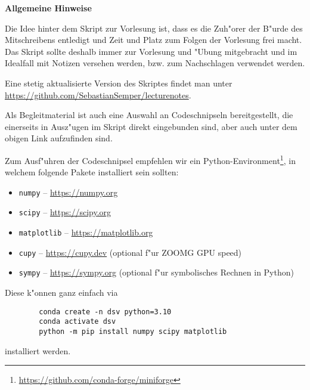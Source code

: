 \glsunsetall
%
\maketitle
\tableofcontents
\clearpage
%
\listoffigures
{}
\listoflistings
{}
\clearpage
%
\pretocmd{\section}{\FloatBarrier\clearpage}{}{}
\pretocmd{\subsection}{\FloatBarrier}{}{}
%
%
\begin{center}
    \begin{minipage}{0.75\textwidth}
        \begin{center}
            \textbf{\large Allgemeine Hinweise}
        \end{center}
        Die Idee hinter dem Skript zur Vorlesung ist, dass es die Zuh"orer der B"urde des Mitschreibens entledigt und Zeit und Platz zum Folgen der Vorlesung frei macht.
        Das Skript sollte deshalb immer zur Vorlesung und "Ubung mitgebracht und im Idealfall mit Notizen versehen werden, bzw. zum Nachschlagen verwendet werden.

        Eine stetig aktualisierte Version des Skriptes findet man unter \url{https://github.com/SebastianSemper/lecturenotes}.

        Als Begleitmaterial ist auch eine Auswahl an Codeschnipseln bereitgestellt, die einerseits in Ausz"ugen im Skript direkt eingebunden sind, aber auch unter dem obigen Link aufzufinden sind.

        Zum Ausf"uhren der Codeschnipsel empfehlen wir ein Python-Environment\footnote{\url{https://github.com/conda-forge/miniforge}}, in welchem folgende Pakete installiert sein sollten:
        \begin{itemize}
            \item \texttt{numpy} -- \url{https://numpy.org}
            \item \texttt{scipy} -- \url{https://scipy.org}
            \item \texttt{matplotlib} -- \url{https://matplotlib.org}
            \item \texttt{cupy} -- \url{https://cupy.dev} (optional f"ur ZOOMG GPU speed)
            \item \texttt{sympy} -- \url{https://sympy.org} (optional f"ur symbolisches Rechnen in Python)
        \end{itemize}
        Diese k"onnen ganz einfach via
        \begin{verbatim}
        conda create -n dsv python=3.10
        conda activate dsv
        python -m pip install numpy scipy matplotlib
        \end{verbatim}
        installiert werden.


\end{minipage}
\end{center}
